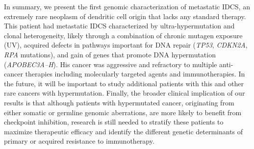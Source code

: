 In summary, we present the first genomic characterization of metastatic IDCS, an extremely rare neoplasm of dendritic cell origin that lacks any standard therapy. This patient had metastatic IDCS characterized by ultra-hypermutation and clonal heterogeneity, likely through a combination of chronic mutagen exposure (UV), acquired defects in pathways important for DNA repair (\textit{TP53}, \textit{CDKN2A}, \textit{RPA} mutations), and gain of genes that promote DNA hypermutation (\textit{APOBEC3A--H})\@. His cancer was aggressive and refractory to multiple anti-cancer therapies including molecularly targeted agents and immunotherapies. In the future, it will be important to study additional patients with this and other rare cancers with hypermutation. Finally, the broader clinical implication of our results is that although patients with hypermutated cancer, originating from either somatic or germline genomic aberrations, are more likely to benefit from checkpoint inhibition, research is still needed to stratify these patients to maximize therapeutic efficacy and identify the different genetic determinants of primary or acquired resistance to immunotherapy.

